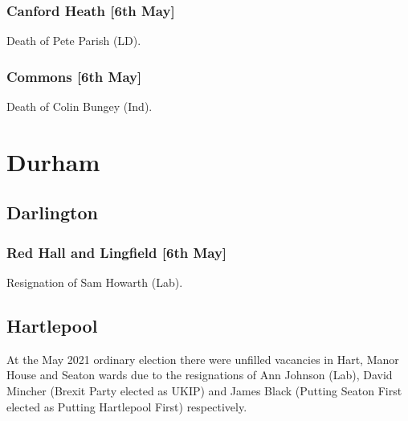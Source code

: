 \documentclass[a4paper,openany]{book}
\begin{document}
\begin{resultsiii}
\subsubsection*{Canford Heath \hspace*{\fill}\nolinebreak[1]%
	\enspace\hspace*{\fill}
	[6th May]}


Death of Pete Parish (LD).

\subsubsection*{Commons \hspace*{\fill}\nolinebreak[1]%
	\enspace\hspace*{\fill}
	[6th May]}


Death of Colin Bungey (Ind).

\section{Durham}

\subsection*{Darlington}

\subsubsection*{Red Hall and Lingfield \hspace*{\fill}\nolinebreak[1]%
	\enspace\hspace*{\fill}
	[6th May]}


Resignation of Sam Howarth (Lab).

\subsection*{Hartlepool}

At the May 2021 ordinary election there were unfilled vacancies in Hart, Manor House and Seaton wards due to the resignations of Ann Johnson (Lab), David Mincher (Brexit Party elected as UKIP) and James Black (Putting Seaton First elected as Putting Hartlepool First) respectively.


\end{resultsiii}
\end{document}
